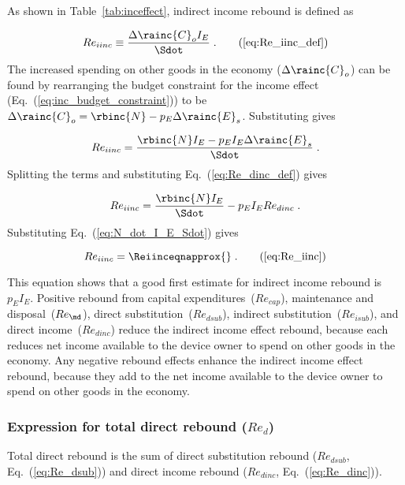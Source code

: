 As shown in Table~\ref{tab:inceffect}, indirect income rebound is defined as

\begin{equation}
  Re_{iinc} \equiv \frac{\Delta \rainc{C}_o I_E}{\Sdot} \; . \tag{\ref{eq:Re_iinc_def}}
\end{equation}
%
The increased spending on other goods in the economy ($\Delta \rainc{C}_o$)
can be found by rearranging the budget constraint for the income effect 
(Eq.~(\ref{eq:inc_budget_constraint})) to be 
$\Delta \rainc{C}_o = \rbinc{N} - p_E \Delta \rainc{E}_s$.
Substituting gives

\begin{equation}
  Re_{iinc} = \frac{\rbinc{N} I_E - p_E I_E \Delta \rainc{E}_s}{\Sdot} \; .
\end{equation}
%
Splitting the terms and substituting Eq.~(\ref{eq:Re_dinc_def}) gives

\begin{equation}
  Re_{iinc} = \frac{\rbinc{N} I_E}{\Sdot} - p_E I_E Re_{dinc} \; .
\end{equation}
%
Substituting Eq.~(\ref{eq:N_dot_I_E_Sdot}) gives 

\begin{equation}
  Re_{iinc} = \Reiinceqnapprox{} \; . \tag{\ref{eq:Re_iinc}}
\end{equation}

This equation shows that a good first estimate for indirect income rebound
is $p_E I_E$.
Positive rebound from capital expenditures~($Re_{cap}$), 
maintenance and disposal~($Re_{\md}$),
direct substitution~($Re_{dsub}$), 
indirect substitution~($Re_{isub}$), and 
direct income~($Re_{dinc}$)
reduce the indirect income effect rebound, 
because each reduces net income available to the device owner to spend on other goods in the economy.
Any negative rebound effects enhance the indirect income effect rebound, because 
they add to the net income available to the device owner to spend on other goods in the economy.


\subsubsection{Expression for total direct rebound ($Re_d$)} 
\label{sec:Re_d}

Total direct rebound is the sum of 
direct substitution rebound ($Re_{dsub}$, Eq.~(\ref{eq:Re_dsub})) and
direct income rebound ($Re_{dinc}$, Eq.~(\ref{eq:Re_dinc})).


